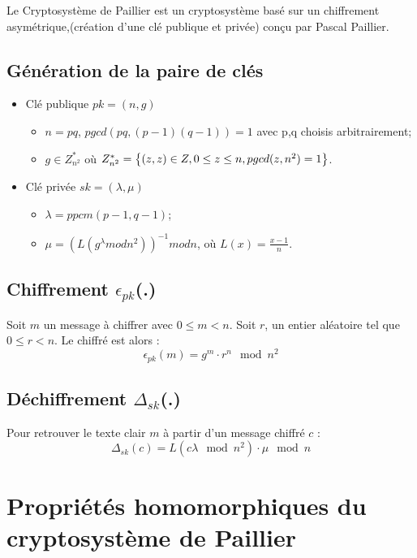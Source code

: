 Le Cryptosystème de Paillier est un cryptosystème basé sur un chiffrement asymétrique,(création d'une clé publique et privée) conçu par Pascal Paillier. 

\subsection{Génération de la paire de clés}

\begin{itemize}
\item Clé publique $pk = (n,g)$
	\begin{itemize}
	\item $n = pq$, $pgcd(pq,(p-1)(q-1))=1$ avec p,q choisis arbitrairement;
	\item $g \in {Z}^*_{n^2}$ où ${Z}^*_{n^2}= \left\{(z,z) \in{Z},\\ 0\le z \le n, pgcd(z,n^2)=1 \right\}$.
	\end{itemize} 
\item Clé privée $sk=(\lambda, \mu)$
	\begin{itemize}
	\item $\lambda=ppcm(p-1,q-1)$;
	\item $\mu = (L(g^{\lambda}mod n^2))^{-1}modn$, où $L(x)=\frac{x-1}{n}$. 
	\end{itemize}
\end{itemize}
\vspace{0.5\baselineskip}

\subsection{Chiffrement $\epsilon_{pk}$(.)} %

Soit $m$ un message à chiffrer avec $0 \leq m<n$. Soit $r$, un entier aléatoire tel que $0 \leq r<n$. Le chiffré est alors :
\[
    \epsilon _{pk}(m)=g^m \cdot r^n \mod n^2
\]

\subsection{Déchiffrement $\Delta_{sk}$(.)}

Pour retrouver le texte clair $m$ à partir d'un message chiffré $c$ :
\[
    \Delta_{sk}(c)= L(c{\lambda} \mod n^2) \cdot \mu \mod n
\]

\section{Propriétés homomorphiques du cryptosystème de Paillier}

